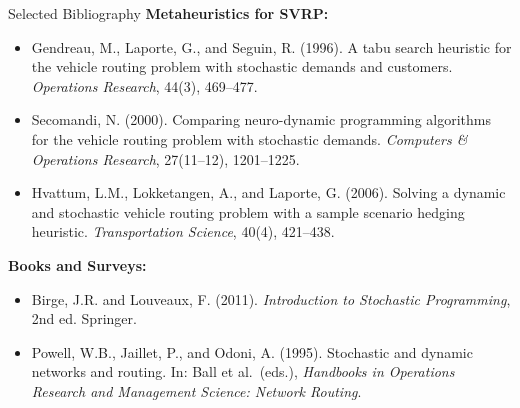 \documentclass[aspectratio=169,10pt]{beamer}
\begin{document}
\begin{frame}[allowframebreaks]{Selected Bibliography}
  \textbf{Metaheuristics for SVRP:}
  \begin{itemize}
    \item Gendreau, M., Laporte, G., and Seguin, R. (1996).
          A tabu search heuristic for the vehicle routing problem with
          stochastic demands and customers.
          \emph{Operations Research}, 44(3), 469--477.
    \item Secomandi, N. (2000).
          Comparing neuro-dynamic programming algorithms for the vehicle
          routing problem with stochastic demands.
          \emph{Computers \& Operations Research}, 27(11--12), 1201--1225.
    \item Hvattum, L.M., Lokketangen, A., and Laporte, G. (2006).
          Solving a dynamic and stochastic vehicle routing problem with
          a sample scenario hedging heuristic.
          \emph{Transportation Science}, 40(4), 421--438.
  \end{itemize}

  \textbf{Books and Surveys:}
  \begin{itemize}
    \item Birge, J.R. and Louveaux, F. (2011).
          \emph{Introduction to Stochastic Programming}, 2nd ed.
          Springer.
    \item Powell, W.B., Jaillet, P., and Odoni, A. (1995).
          Stochastic and dynamic networks and routing.
          In: Ball et al.\ (eds.), \emph{Handbooks in Operations Research
          and Management Science: Network Routing}.
  \end{itemize}

\end{frame}

\end{document}
